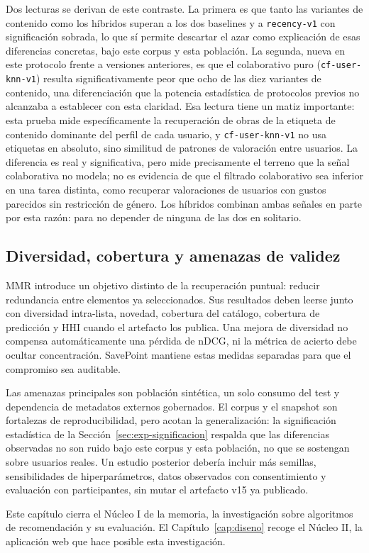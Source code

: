 Dos lecturas se derivan de este contraste. La primera es que tanto las variantes de contenido
como los híbridos superan a los dos baselines y a \texttt{recency-v1} con significación
sobrada, lo que sí permite descartar el azar como explicación de esas diferencias concretas,
bajo este corpus y esta población. La segunda, nueva en este protocolo frente a versiones
anteriores, es que el colaborativo puro (\texttt{cf-user-knn-v1}) resulta significativamente
peor que ocho de las diez variantes de contenido, una diferenciación que la potencia
estadística de protocolos previos no alcanzaba a establecer con esta claridad. Esa lectura
tiene un matiz importante: esta prueba mide específicamente la recuperación de obras de la
etiqueta de contenido dominante del perfil de cada usuario, y \texttt{cf-user-knn-v1} no usa
etiquetas en absoluto, sino similitud de patrones de valoración entre usuarios. La diferencia
es real y significativa, pero mide precisamente el terreno que la señal colaborativa no
modela; no es evidencia de que el filtrado colaborativo sea inferior en una tarea distinta,
como recuperar valoraciones de usuarios con gustos parecidos sin restricción de género. Los
híbridos combinan ambas señales en parte por esta razón: para no depender de ninguna de las
dos en solitario.

\subsection{Diversidad, cobertura y amenazas de validez}\label{sec:exp-amenazas}

MMR introduce un objetivo distinto de la recuperación puntual: reducir redundancia entre elementos ya seleccionados. Sus resultados deben leerse junto con diversidad intra-lista, novedad, cobertura del catálogo, cobertura de predicción y HHI cuando el artefacto los publica. Una mejora de diversidad no compensa automáticamente una pérdida de nDCG, ni la métrica de acierto debe ocultar concentración. SavePoint mantiene estas medidas separadas para que el compromiso sea auditable.

Las amenazas principales son población sintética, un solo consumo del test y dependencia de
metadatos externos gobernados. El corpus y el snapshot son fortalezas de reproducibilidad,
pero acotan la generalización: la significación estadística de la Sección~\ref{sec:exp-significacion}
respalda que las diferencias observadas no son ruido bajo este corpus y esta población, no
que se sostengan sobre usuarios reales. Un estudio posterior debería incluir más semillas,
sensibilidades de hiperparámetros, datos observados con consentimiento y evaluación con
participantes, sin mutar el artefacto v15 ya publicado.

Este capítulo cierra el Núcleo I de la memoria, la investigación sobre algoritmos de
recomendación y su evaluación. El Capítulo~\ref{cap:diseno} recoge el Núcleo II, la aplicación
web que hace posible esta investigación.
